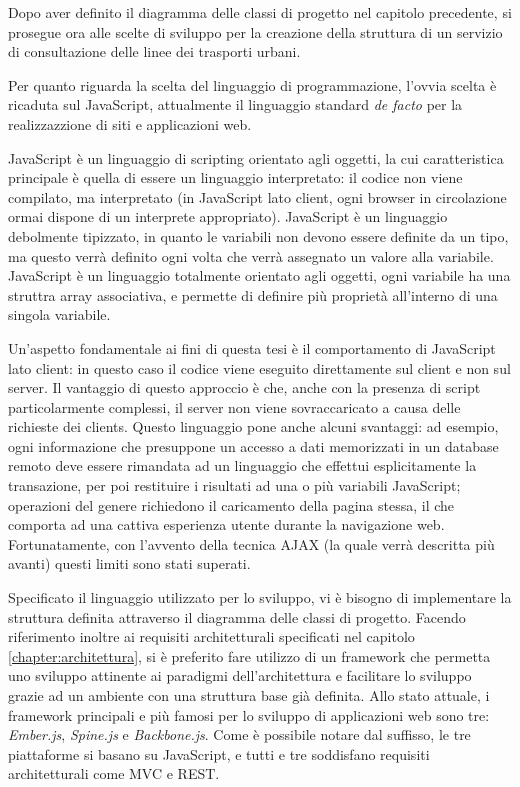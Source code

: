 Dopo aver definito il diagramma delle classi di progetto nel capitolo precedente, si prosegue ora alle scelte di sviluppo per la creazione della struttura di un servizio di consultazione delle linee dei trasporti urbani.

Per quanto riguarda la scelta del linguaggio di programmazione, l'ovvia scelta è ricaduta sul JavaScript, attualmente il linguaggio standard {\itshape de facto} per la realizzazzione di siti e applicazioni web.

JavaScript è un linguaggio di scripting orientato agli oggetti, la cui caratteristica principale è quella di essere un linguaggio interpretato: il codice non viene compilato, ma interpretato (in JavaScript lato client, ogni browser in circolazione ormai dispone di un interprete appropriato).
JavaScript è un linguaggio debolmente tipizzato, in quanto le variabili non devono essere definite da un tipo, ma questo verrà definito ogni volta che verrà assegnato un valore alla variabile. JavaScript è un linguaggio totalmente orientato agli oggetti, ogni variabile ha una struttra array associativa, e permette di definire più proprietà all'interno di una singola variabile.

Un'aspetto fondamentale ai fini di questa tesi è il comportamento di JavaScript lato client: in questo caso il codice viene eseguito direttamente sul client e non sul server. Il vantaggio di questo approccio è che, anche con la presenza di script particolarmente complessi, il server non viene sovraccaricato a causa delle richieste dei clients. Questo linguaggio pone anche alcuni svantaggi: ad esempio, ogni informazione che presuppone un accesso a dati memorizzati in un database remoto deve essere rimandata ad un linguaggio che effettui esplicitamente la transazione, per poi restituire i risultati ad una o più variabili JavaScript; operazioni del genere richiedono il caricamento della pagina stessa, il che comporta ad una cattiva esperienza utente durante la navigazione web. Fortunatamente, con l'avvento della tecnica AJAX (la quale verrà descritta più avanti) questi limiti sono stati superati.

\vspace{1cm}
Specificato il linguaggio utilizzato per lo sviluppo, vi è bisogno di implementare la struttura definita attraverso il diagramma delle classi di progetto. Facendo riferimento inoltre ai requisiti architetturali specificati nel capitolo \ref{chapter:architettura}, si è preferito fare utilizzo di un framework che permetta uno sviluppo attinente ai paradigmi dell'architettura e facilitare lo sviluppo grazie ad un ambiente con una struttura base già definita.
Allo stato attuale, i framework principali e più famosi per lo sviluppo di applicazioni web sono tre: {\itshape Ember.js}, {\itshape Spine.js} e {\itshape Backbone.js}. Come è possibile notare dal suffisso, le tre piattaforme si basano su JavaScript, e tutti e tre soddisfano requisiti architetturali come MVC e REST.

